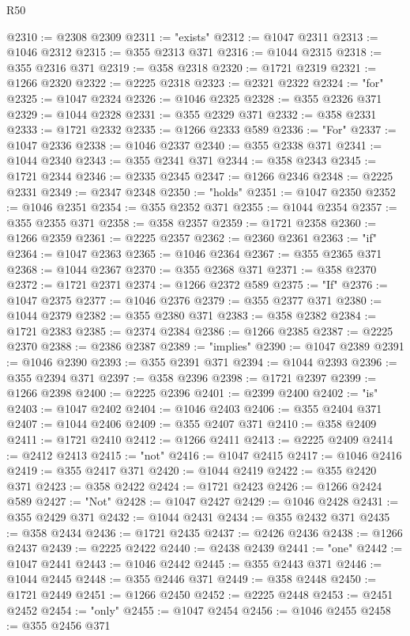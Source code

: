 \begin{lexlean}{R50}
\begin{coremodule}
@2310 := @2308 @2309
@2311 := "exists"
@2312 := @1047 @2311
@2313 := @1046 @2312
@2315 := @355 @2313 @371
@2316 := @1044 @2315
@2318 := @355 @2316 @371
@2319 := @358 @2318
@2320 := @1721 @2319
@2321 := @1266 @2320
@2322 := @2225 @2318
@2323 := @2321 @2322
@2324 := "for"
@2325 := @1047 @2324
@2326 := @1046 @2325
@2328 := @355 @2326 @371
@2329 := @1044 @2328
@2331 := @355 @2329 @371
@2332 := @358 @2331
@2333 := @1721 @2332
@2335 := @1266 @2333 @589
@2336 := "For"
@2337 := @1047 @2336
@2338 := @1046 @2337
@2340 := @355 @2338 @371
@2341 := @1044 @2340
@2343 := @355 @2341 @371
@2344 := @358 @2343
@2345 := @1721 @2344
@2346 := @2335 @2345
@2347 := @1266 @2346
@2348 := @2225 @2331
@2349 := @2347 @2348
@2350 := "holds"
@2351 := @1047 @2350
@2352 := @1046 @2351
@2354 := @355 @2352 @371
@2355 := @1044 @2354
@2357 := @355 @2355 @371
@2358 := @358 @2357
@2359 := @1721 @2358
@2360 := @1266 @2359
@2361 := @2225 @2357
@2362 := @2360 @2361
@2363 := "if"
@2364 := @1047 @2363
@2365 := @1046 @2364
@2367 := @355 @2365 @371
@2368 := @1044 @2367
@2370 := @355 @2368 @371
@2371 := @358 @2370
@2372 := @1721 @2371
@2374 := @1266 @2372 @589
@2375 := "If"
@2376 := @1047 @2375
@2377 := @1046 @2376
@2379 := @355 @2377 @371
@2380 := @1044 @2379
@2382 := @355 @2380 @371
@2383 := @358 @2382
@2384 := @1721 @2383
@2385 := @2374 @2384
@2386 := @1266 @2385
@2387 := @2225 @2370
@2388 := @2386 @2387
@2389 := "implies"
@2390 := @1047 @2389
@2391 := @1046 @2390
@2393 := @355 @2391 @371
@2394 := @1044 @2393
@2396 := @355 @2394 @371
@2397 := @358 @2396
@2398 := @1721 @2397
@2399 := @1266 @2398
@2400 := @2225 @2396
@2401 := @2399 @2400
@2402 := "is"
@2403 := @1047 @2402
@2404 := @1046 @2403
@2406 := @355 @2404 @371
@2407 := @1044 @2406
@2409 := @355 @2407 @371
@2410 := @358 @2409
@2411 := @1721 @2410
@2412 := @1266 @2411
@2413 := @2225 @2409
@2414 := @2412 @2413
@2415 := "not"
@2416 := @1047 @2415
@2417 := @1046 @2416
@2419 := @355 @2417 @371
@2420 := @1044 @2419
@2422 := @355 @2420 @371
@2423 := @358 @2422
@2424 := @1721 @2423
@2426 := @1266 @2424 @589
@2427 := "Not"
@2428 := @1047 @2427
@2429 := @1046 @2428
@2431 := @355 @2429 @371
@2432 := @1044 @2431
@2434 := @355 @2432 @371
@2435 := @358 @2434
@2436 := @1721 @2435
@2437 := @2426 @2436
@2438 := @1266 @2437
@2439 := @2225 @2422
@2440 := @2438 @2439
@2441 := "one"
@2442 := @1047 @2441
@2443 := @1046 @2442
@2445 := @355 @2443 @371
@2446 := @1044 @2445
@2448 := @355 @2446 @371
@2449 := @358 @2448
@2450 := @1721 @2449
@2451 := @1266 @2450
@2452 := @2225 @2448
@2453 := @2451 @2452
@2454 := "only"
@2455 := @1047 @2454
@2456 := @1046 @2455
@2458 := @355 @2456 @371

\end{coremodule}
\end{lexlean}
